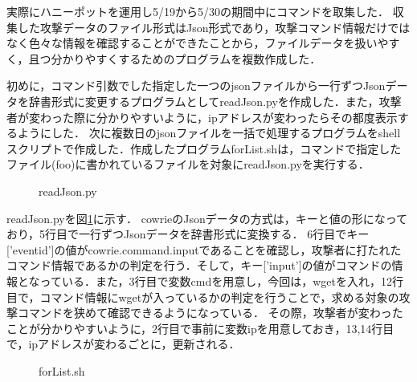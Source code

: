 \documentclass[dvipdfmx]{bta}
\begin{document}

実際にハニーポットを運用し5/19から5/30の期間中にコマンドを取集した．
収集した攻撃データのファイル形式はJson形式であり，攻撃コマンド情報だけではなく色々な情報を確認することができたことから，ファイルデータを扱いやすく，且つ分かりやすくするためのプログラムを複数作成した．

初めに，コマンド引数でした指定した一つのjsonファイルから一行ずつJsonデータを辞書形式に変更するプログラムとしてreadJson.pyを作成した．また，攻撃者が変わった際に分かりやすいように，ipアドレスが変わったらその都度表示するようにした．
次に複数日のjsonファイルを一括で処理するプログラムをshellスクリプトで作成した．作成したプログラムforList.shは，コマンドで指定したファイル(foo)に書かれているファイルを対象にreadJson.pyを実行する．

\begin{figure}[htbp]

	
	\caption{readJson.py}\label{fig:readJson.py}
	
\end{figure}

readJson.pyを図\ref{fig:readJson.py}に示す．
cowrieのJsonデータの方式は，キーと値の形になっており，5行目で一行ずつJsonデータを辞書形式に変換する．
6行目でキー['eventid']の値がcowrie.command.inputであることを確認し，攻撃者に打たれたコマンド情報であるかの判定を行う．そして，キー['input']の値がコマンドの情報となっている．また，3行目で変数cmdを用意し，今回は，wgetを入れ，12行目で，コマンド情報にwgetが入っているかの判定を行うことで，求める対象の攻撃コマンドを狭めて確認できるようになっている．
その際，攻撃者が変わったことが分かりやすいように，2行目で事前に変数ipを用意しておき，13,14行目で，ipアドレスが変わるごとに，更新される．
\begin{figure}[htbp]

	
	\caption{forList.sh}\label{fig:forList.sh}
	
\end{figure}
\end{document}
